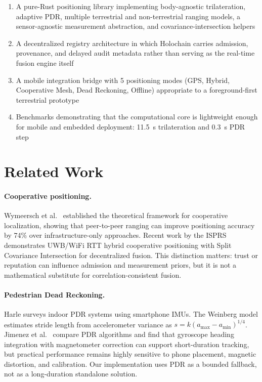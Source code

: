 \documentclass[12pt,a4paper]{article}
\begin{document}
\begin{enumerate}
    \item A pure-Rust positioning library implementing body-agnostic trilateration, adaptive PDR, multiple terrestrial and non-terrestrial ranging models, a sensor-agnostic measurement abstraction, and covariance-intersection helpers
    \item A decentralized registry architecture in which Holochain carries admission, provenance, and delayed audit metadata rather than serving as the real-time fusion engine itself
    \item A mobile integration bridge with 5 positioning modes (GPS, Hybrid, Cooperative Mesh, Dead Reckoning, Offline) appropriate to a foreground-first terrestrial prototype
    \item Benchmarks demonstrating that the computational core is lightweight enough for mobile and embedded deployment: 11.5~\textmu s trilateration and 0.3~\textmu s PDR step
\end{enumerate}

\section{Related Work}

\paragraph{Cooperative positioning.} Wymeersch et al.\ \citep{wymeersch2009cooperative} established the theoretical framework for cooperative localization, showing that peer-to-peer ranging can improve positioning accuracy by 74\% over infrastructure-only approaches. Recent work by the ISPRS \citep{isprs2025uwb} demonstrates UWB/WiFi RTT hybrid cooperative positioning with Split Covariance Intersection for decentralized fusion. This distinction matters: trust or reputation can influence admission and measurement priors, but it is not a mathematical substitute for correlation-consistent fusion.

\paragraph{Pedestrian Dead Reckoning.} Harle \citep{harle2013survey} surveys indoor PDR systems using smartphone IMUs. The Weinberg model \citep{weinberg2002using} estimates stride length from accelerometer variance as $s = k(a_{\max} - a_{\min})^{1/4}$. Jimenez et al.\ \citep{jimenez2009comparison} compare PDR algorithms and find that gyroscope heading integration with magnetometer correction can support short-duration tracking, but practical performance remains highly sensitive to phone placement, magnetic distortion, and calibration. Our implementation uses PDR as a bounded fallback, not as a long-duration standalone solution.
\end{document}

